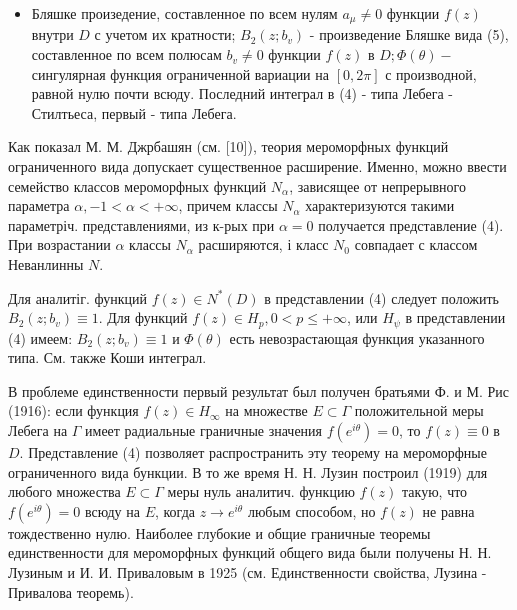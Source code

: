 \documentclass[10pt]{article}
\begin{document}
\begin{itemize}

  \item Бляшке произедение, составленное по всем нулям $a_{\mu} \neq 0$ функции $f(z)$ внутри $D$ с учетом их кратности; $B_{2}\left(z ; b_{v}\right)$ - произведение Бляшке вида (5), составленное по всем полюсам $b_{v} \neq 0$ функции $f(z)$ в $D ; \Phi(\theta)-$ сингулярная функция ограниченной вариации на $[0,2 \pi]$ с производной, равной нулю почти всюду. Последний интеграл в (4) - типа Лебега - Стилтьеса, первый - типа Лебега.

\end{itemize}



Как показал М. М. Джрбашян (см. [10]), теория мероморфных функций ограниченного вида допускает существенное расширение. Именно, можно ввести семейство классов мероморфных функций $N_{\alpha}$, зависящее от непрерывного параметра $\alpha,-1<\alpha<+\infty$, причем классы $N_{\alpha}$ характеризуются такими параметріч. представлениями, из к-рых при $\alpha=0$ получается представление (4). При возрастании $\alpha$ классы $N_{\alpha}$ расширяются, і класс $N_{0}$ совпадает с классом Неванлинны $N$.



Для аналитіг. функций $f(z) \in N^{*}(D)$ в представлении (4) следует положить $B_{2}\left(z ; b_{v}\right) \equiv 1$. Для функций $f(z) \in H_{p}, 0<p \leqslant+\infty$, или $H_{\psi}$ в представлении (4) имеем: $B_{2}\left(z ; b_{v}\right) \equiv 1$ и $\Phi(\theta)$ есть невозрастающая функция указанного типа. См. также Коши интеграл.



В проблеме единственности первый результат был получен братьями Ф. и М. Рис (1916): если функция $f(z) \in H_{\infty}$ на множестве $E \subset \Gamma$ положительной меры Лебега на $\Gamma$ имеет радиальные граничные значения $f\left(e^{i \theta}\right)=0$, то $f(z) \equiv 0$ в $D$. Представление (4) позволяет распространить эту теорему на мероморфные ограниченного вида бункции. В то же время Н. Н. Лузин построил (1919) для любого множества $E \subset \Gamma$ меры нуль аналитич. функцию $f(z)$ такую, что $f\left(e^{i \theta}\right)=0$ всюду на $E$, когда $z \rightarrow e^{i \theta}$ любым способом, но $f(z)$ не равна тождественно нулю. Наиболее глубокие и общие граничные теоремы единственности для мероморфных функций общего вида были получены Н. Н. Лузиным и И. И. Приваловым в 1925 (см. Единственности свойства, Лузина - Привалова теоремь).
\end{document}
